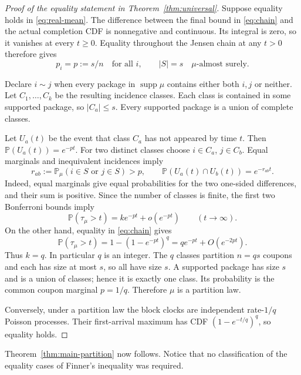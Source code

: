 \documentclass[11pt]{article}
\numberwithin{equation}{section}
\theoremstyle{remark}
\newcommand{\Pp}{\mathbb P}
\newcommand{\1}{\mathbf 1}
\newcommand{\supp}{\operatorname{supp}}
\begin{document}
\begin{proof}[Proof of the equality statement in Theorem~\ref{thm:universal}]
Suppose equality holds in \eqref{eq:real-mean}. The difference between the final bound in \eqref{eq:chain} and the actual completion CDF is nonnegative and continuous. Its integral is zero, so it vanishes at every $t\geq0$. Equality throughout the Jensen chain at any $t>0$ therefore gives
\begin{equation}\label{eq:equality-balance}
 p_i=p:=s/n\quad\text{for all }i,
 \qquad |S|=s\quad\mu\text{-almost surely}.
\end{equation}

Declare $i\sim j$ when every package in $\supp\mu$ contains either both $i,j$ or neither. Let $C_1,\ldots,C_k$ be the resulting incidence classes. Each class is contained in some supported package, so $|C_a|\leq s$. Every supported package is a union of complete classes.

Let $U_a(t)$ be the event that class $C_a$ has not appeared by time $t$. Then
$\Pp(U_a(t))=e^{-pt}$. For two distinct classes choose $i\in C_a$, $j\in C_b$. Equal marginals and inequivalent incidences imply
\[
 r_{ab}:=\Pp_\mu(i\in S\text{ or }j\in S)>p,
 \qquad
 \Pp(U_a(t)\cap U_b(t))=e^{-r_{ab}t}.
\]
Indeed, equal marginals give equal probabilities for the two one-sided differences, and their sum is positive. Since the number of classes is finite, the first two Bonferroni bounds imply
\begin{equation}\label{eq:class-tail}
 \Pp(\tau_\mu>t)=k e^{-pt}+o(e^{-pt})
 \qquad(t\longrightarrow\infty).
\end{equation}
On the other hand, equality in \eqref{eq:chain} gives
\[
 \Pp(\tau_\mu>t)=1-(1-e^{-pt})^q
 =q e^{-pt}+O(e^{-2pt}).
\]
Thus $k=q$. In particular $q$ is an integer. The $q$ classes partition $n=qs$ coupons and each has size at most $s$, so all have size $s$. A supported package has size $s$ and is a union of classes; hence it is exactly one class. Its probability is the common coupon marginal $p=1/q$. Therefore $\mu$ is a partition law.

Conversely, under a partition law the block clocks are independent rate-$1/q$ Poisson processes. Their first-arrival maximum has CDF $(1-e^{-t/q})^q$, so equality holds.
\end{proof}

Theorem~\ref{thm:main-partition} now follows. Notice that no classification of the equality cases of Finner's inequality was required.
\end{document}
